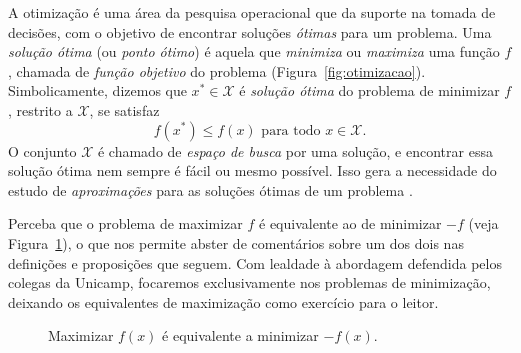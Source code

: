 A otimização é uma área da pesquisa operacional que da suporte na tomada de decisões, com o objetivo de encontrar soluções \textit{ótimas} para um problema. Uma \textit{solução ótima} (ou \textit{ponto ótimo}) é aquela que \textit{minimiza} ou \textit{maximiza} uma função $f$, chamada de \textit{função objetivo} do problema (Figura~\ref{fig:otimizacao}). Simbolicamente, dizemos que $x^* \in \mathcal{X}$ é \textit{solução ótima} do problema de minimizar $f$, restrito a $\mathcal{X}$, se satisfaz $$f(x^*)\leq f(x)\text{ para todo } x\in \mathcal{X}.$$ O conjunto $\mathcal{X}$ é chamado de \textit{espaço de busca} por uma solução, e encontrar essa solução ótima nem sempre é fácil ou mesmo possível. Isso gera a necessidade do estudo de \textit{aproximações} para as soluções ótimas de um problema \cite{elizabeth2013otimizaccao}.  

Perceba que o problema de maximizar $f$ é equivalente ao de minimizar $-f$ (veja Figura~\ref{fig:max_min_equiv}), o que nos permite abster de comentários sobre um dos dois nas definições e proposições que seguem. Com lealdade à abordagem defendida pelos colegas da Unicamp, focaremos exclusivamente nos problemas de minimização, deixando os equivalentes de maximização como exercício para o leitor. 

\begin{figure}[h]
    \centering
    \caption{Maximizar $f(x)$ é equivalente a minimizar $-f(x)$.}
    \label{fig:max_min_equiv}
\end{figure}

